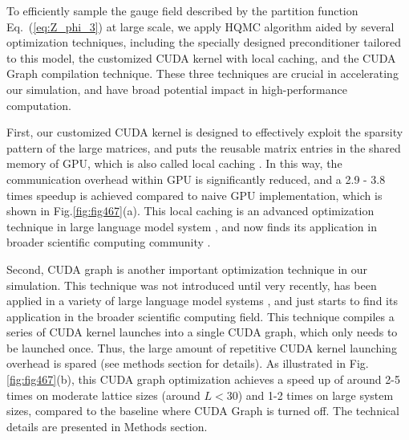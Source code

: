 \documentclass[aps,prl,twocolumn,superscriptaddress,showpacs,longbibliography]{revtex4-2}
\newcommand{\refeq}[1]{\textmd{Eq.\ }(\ref{#1})}
\begin{document}
\vspace{3mm}

To efficiently sample the gauge field described by the partition function \refeq{eq:Z_phi_3} at large scale, we apply HQMC algorithm aided by several optimization techniques, including the specially designed preconditioner tailored to this model, the customized CUDA kernel with local caching, and the CUDA Graph compilation technique. These three techniques are crucial in accelerating our simulation, and have broad potential impact in high-performance computation.

First, our customized CUDA kernel is designed to effectively exploit the sparsity pattern of the large matrices, and puts the reusable matrix entries in the shared memory of GPU, which is also called local caching \cite{lunts2023non}. In this way, the communication overhead within GPU is significantly reduced, and a 2.9 - 3.8 times speedup is achieved compared to naive GPU implementation, which is shown in Fig.\ref{fig:fig467}(a). This local caching is an advanced optimization technique in large language model system \cite{dao2022flashattention}, and now finds its application in broader scientific computing community \cite{lunts2023non, patel2024strange}. 

Second, 
CUDA graph is another important optimization technique in our simulation. This technique was not introduced until very recently, has been applied in a variety of large language model systems \cite{kwon2023efficient, zheng2024sglang}, and just starts to find its application in the broader scientific computing field. This technique compiles a series of CUDA kernel launches into a single CUDA graph, which only needs to be launched once. Thus, the large amount of repetitive CUDA kernel launching overhead is spared (see methods section for details). As illustrated in Fig.\ref{fig:fig467}(b), this CUDA graph optimization achieves a speed up of around 2-5 times on moderate lattice sizes (around $L < 30$)
and 1-2 times on large system sizes, compared to the baseline where CUDA Graph is turned off. The technical details are presented in Methods section. 
\end{document}

